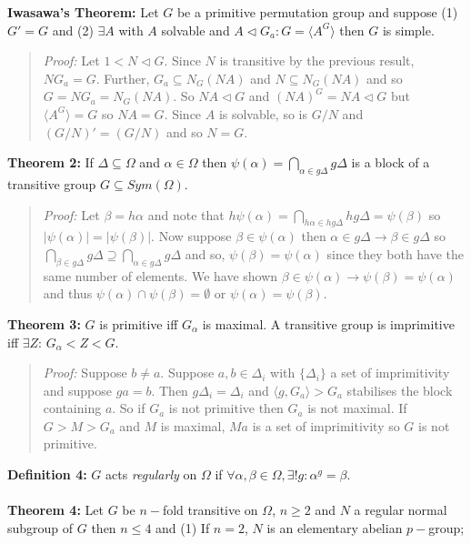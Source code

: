 {\bf Iwasawa's Theorem:}  Let $G$ be a primitive permutation group and suppose (1) $G'=G$ and
(2) $\exists A$ with $A$ solvable  and $A \lhd G_a: G=
\langle A^G \rangle $ then $G$ is simple.
\begin{quote}
\emph{Proof:}  
Let $1 < N \lhd G$.  Since $N$ is transitive by the previous result, $NG_a=G$.  Further,
$G_a \subseteq N_G(NA)$ and $N \subseteq N_G(NA)$ and so $G= NG_a= N_G(NA)$. So $NA \lhd G$ and
$(NA)^G =NA \lhd G$ but $ \langle A^G \rangle = G$ so $NA=G$. 
Since $A$ is solvable, so is $G/N$ and
$(G/N)'=(G/N)$ and so $N = G$.
\end{quote}
{\bf Theorem 2:}
If $\Delta \subseteq \Omega$ and $\alpha \in \Omega$ then 
$\psi( \alpha ) = \bigcap_{\alpha \in g \Delta} g \Delta$ is a block of a transitive
group $G \subseteq Sym(\Omega)$.
\begin{quote}
\emph{Proof:}  
Let $\beta= h \alpha$ and
note that 
$h \psi( \alpha ) = \bigcap_{h \alpha \in hg \Delta} hg \Delta= \psi( \beta )$ so
$ |\psi( \alpha )|= |\psi( \beta )| $.   Now suppose $\beta \in \psi( \alpha )$ then
$\alpha \in g \Delta \rightarrow \beta \in g \Delta$ so 
$\bigcap_{\beta \in g \Delta} g \Delta \supseteq \bigcap_{\alpha \in g \Delta} g \Delta$ and
so, $\psi( \beta ) = \psi ( \alpha )$ since they both have the same number of elements.  We have
shown $\beta \in \psi( \alpha ) \rightarrow  \psi( \beta ) = \psi( \alpha )$ and thus
$\psi( \alpha ) \cap \psi( \beta ) = \emptyset$  or 
$\psi( \alpha ) = \psi( \beta )$.
\end{quote}
{\bf Theorem 3:}
$G$ is primitive iff $G_{\alpha}$ is maximal.
A transitive group is imprimitive iff $\exists Z$: $G_{\alpha} < Z < G$.
\begin{quote}
\emph{Proof:}  
Suppose $b \ne a$.  Suppose $a, b \in \Delta_i$ with $\{ \Delta_i \}$ a set of
imprimitivity and suppose $g a= b$.  Then $g \Delta_i = \Delta_i$ and 
$ \langle g, G_a \rangle > G_a$
stabilises the block containing $a$.  So if $G_a$ is not primitive then $G_a$ is not maximal.
If $G > M > G_a$ and $M$ is maximal, $Ma$ is a set of imprimitivity so $G$ is not primitive.
\end{quote}
{\bf Definition 4:}
$G$ acts \emph{regularly} on $\Omega$ if $\forall \alpha, \beta \in \Omega,
\exists ! g: \alpha^g= \beta$.  
\\
\\
{\bf Theorem 4:}  Let $G$ be $n-$fold transitive on $\Omega$, $n \ge 2$ and $N$ a regular
normal subgroup of $G$ then $n \le 4$ and 
(1) If $n=2$, $N$ is an elementary abelian $p-$group; 
